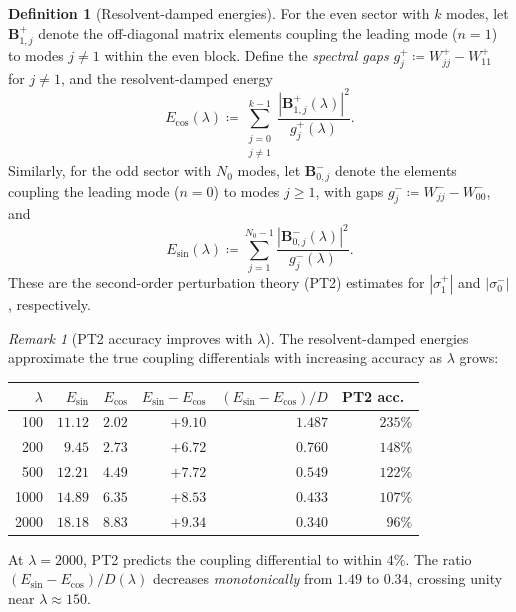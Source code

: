 \documentclass[12pt,a4paper]{article}
\theoremstyle{definition}
\newtheorem{definition}[theorem]{Definition}
\theoremstyle{remark}
\newtheorem{remark}[theorem]{Remark}
\begin{document}
\begin{definition}[Resolvent-damped energies]
\label{def:resolvent-energies}
For the even sector with $k$ modes, let $\mathbf{B}^+_{1,j}$ denote the off-diagonal matrix elements coupling the leading mode ($n=1$) to modes $j \neq 1$ within the even block. Define the \emph{spectral gaps} $g_j^+ \coloneqq W_{jj}^+ - W_{11}^+$ for $j \neq 1$, and the resolvent-damped energy
\[
  E_{\cos}(\lambda) \coloneqq \sum_{\substack{j=0 \\ j \neq 1}}^{k-1} \frac{|\mathbf{B}^+_{1,j}(\lambda)|^2}{g_j^+(\lambda)}.
\]
Similarly, for the odd sector with $N_0$ modes, let $\mathbf{B}^-_{0,j}$ denote the elements coupling the leading mode ($n=0$) to modes $j \geq 1$, with gaps $g_j^- \coloneqq W_{jj}^- - W_{00}^-$, and
\[
  E_{\sin}(\lambda) \coloneqq \sum_{j=1}^{N_0-1} \frac{|\mathbf{B}^-_{0,j}(\lambda)|^2}{g_j^-(\lambda)}.
\]
These are the second-order perturbation theory (PT2) estimates for $|\sigma_1^+|$ and $|\sigma_0^-|$, respectively.
\end{definition}

\begin{remark}[PT2 accuracy improves with $\lambda$]
The resolvent-damped energies approximate the true coupling differentials with increasing accuracy as $\lambda$ grows:

\begin{center}
\small
\renewcommand{\arraystretch}{1.15}
\begin{tabular}{r|rr|rr|r}
$\lambda$ & $E_{\sin}$ & $E_{\cos}$ & $E_{\sin}-E_{\cos}$ & $(E_{\sin}-E_{\cos})/D$ & PT2 acc.\ \\\hline
100  & $11.12$ & $2.02$ & $+9.10$ & $1.487$ & $235\%$ \\
200  & $9.45$  & $2.73$ & $+6.72$ & $0.760$ & $148\%$ \\
500  & $12.21$ & $4.49$ & $+7.72$ & $0.549$ & $122\%$ \\
1000 & $14.89$ & $6.35$ & $+8.53$ & $0.433$ & $107\%$ \\
2000 & $18.18$ & $8.83$ & $+9.34$ & $0.340$ & $96\%$
\end{tabular}
\end{center}

\noindent At $\lambda = 2000$, PT2 predicts the coupling differential to within $4\%$. The ratio $(E_{\sin} - E_{\cos})/D(\lambda)$ decreases \emph{monotonically} from $1.49$ to $0.34$, crossing unity near $\lambda \approx 150$.
\end{remark}
\end{document}
